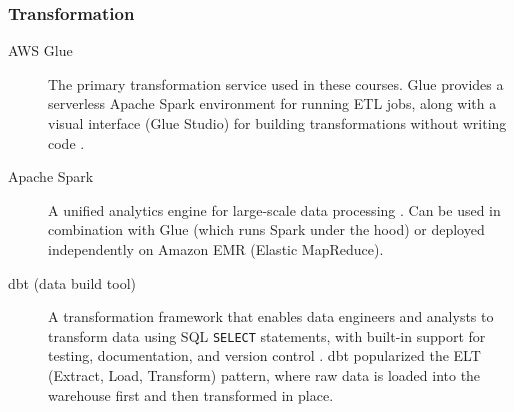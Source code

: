 \documentclass{article}
\begin{document}
\subsubsection{Transformation}
\begin{description}
    \item[AWS Glue] The primary transformation service used in these courses. Glue provides a serverless Apache Spark environment for running ETL jobs, along with a visual interface (Glue Studio) for building transformations without writing code \cite{aws2023glue}.

    \item[Apache Spark] A unified analytics engine for large-scale data processing \cite{zaharia2016spark}. Can be used in combination with Glue (which runs Spark under the hood) or deployed independently on Amazon EMR (Elastic MapReduce).

    \item[dbt (data build tool)] A transformation framework that enables data engineers and analysts to transform data using SQL \texttt{SELECT} statements, with built-in support for testing, documentation, and version control \cite{dbt2020}. dbt popularized the ELT (Extract, Load, Transform) pattern, where raw data is loaded into the warehouse first and then transformed in place.
\end{description}
\end{document}
